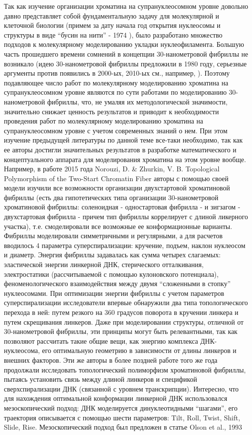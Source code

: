     Так как изучение организации хроматина на супрануклеосомном уровне довольно давно представляет собой фундаментальную задачу для молекулярной и клеточной биологии (примем за дату начала год открытия нуклеосомы и структуры в виде ``бусин на нити'' - 1974 \cite{kornberg_chromatin_1974}), было разработано множество подходов к молекулярному моделированию укладки нуклеофиламента. Большую часть прошедшего времени сомнений в концепции 30-нанометровой фибриллы не возникало (идею 30-нанометровой фибриллы предложили в 1980 году, серьезные аргументы против появились в 2000-ых, 2010-ых  см., например, \cite{joti_chromosomes_2012,razin_chromatin_2014}). Поэтому подавляющее число работ по молекулярному моделированию хроматина на супрануклеосомном уровне являются по сути работами по моделированию 30-нанометровой фибриллы, что, не умаляя их методологической значимости, значительно снижает ценность результатов и приводит к необходимости проведения работ по молекулярному моделированию хроматина на супрануклеосомном уровне с учетом современных знаний о нем.  При этом изучение предыдущей литературы по данной теме все-таки необходимо, так как ее авторы достигли значительных результатов в разработке математического и концептуального  аппарата для моделирования хроматина на этом уровне вообще. Например, в работе 2015 года Norouzi, D. \& Zhurkin, V. B. Topological Polymorphism of the Two-Start Chromatin Fiber \cite{norouzi_topological_2015} авторы с помощью своей модели изучили все возможности организации двухстартовой хроматиновой фибриллы (есть два гипотетических типа организации 30-нанометровой хроматиновой фибриллы: соленоидная - одностартовая фибрилла - и зигзагом - двухстартовая фибрилла - причем тип фибриллы коррелирует с длиной ликерного участка), т.е. смоделировали все возможные ее конформационные варианты. Фибриллы моделировали симметричными и регулярными, а для расчетов вводилось 4 параметра суперспирализации: кручение, подъем, наклон нуклеосом и диаметр. Энергия фибриллы задавалась как сумма четырех слагаемых: эластической энергии линкерной ДНК, стерического отталкивания, электростатики (рассчитываемой с помощью кулоновского потенциала), феноменологического взаимодействия между двумя ``сложенными в стопку'' нуклеосомами. При оптимизации энергии фибриллы с учетом параметров суперспирализации исследователи впервые обнаружили два типа топологического перехода в ней: путем резкого на 360 градусов поворота в кручении линкера и путем скрещивания линкеров. Даже при моделировании структуры, отличной от 30-нанометровой фибриллы, эти принципы могут быть релевантными, так как позволяют рассчитать такие общие вещи, как энергию комплекса ДНК-нуклеосома, его оптимальную геометрию в зависимости от длины линкеров и внешних факторов. Эти же авторы  в более поздней  работе того же года продолжали исследовать топологический полиморфизм хроматиновой фибриллы, пытаясь установить связь между длиной линкеров и спецификой сверхспирализации ДНК (связанной с уровнем транскрипции). Интересно, что для нахождения оптимальной конформации линкерной ДНК использовался мезоскопический подход: ДНК моделируется динуклеотидными ``шагами'', его траектория описывается с помощью шести параметров: Tilt, Roll, Twist, Shift, Slide, Rise. Мезоскопический подход был  предложен в статье Olson et al., 1993 